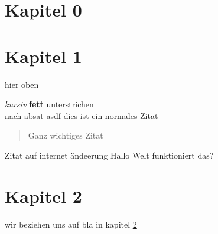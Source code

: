 \chapter{Kapitel 0}

\chapter{Kapitel 1}
\label{kapt1}

hier oben

\textit{kursiv}
\textbf{fett}
\underline{unterstrichen}\\
nach absat
asdf
\titel
dies ist ein normales Zitat\cite{Autor.1992}
\begin{quote}
	Ganz wichtiges Zitat\cite{Abc.2018}
\end{quote}
Zitat auf internet\cite{internet}
ändeerung
Hallo Welt
funktioniert das?

\chapter{Kapitel 2}

wir beziehen uns auf bla in kapitel \ref{kapt1}